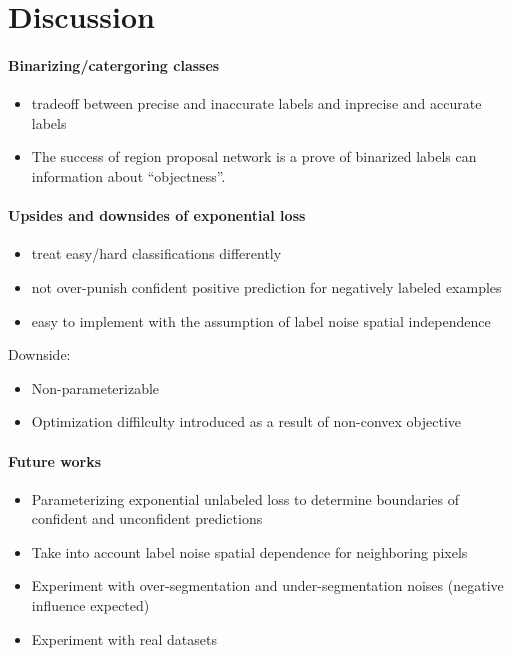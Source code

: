 \section{Discussion}
\label{sec:discussion}


\paragraph{Binarizing/catergoring classes}
\begin{itemize}
  \item tradeoff between precise and inaccurate labels and inprecise and accurate labels
  \item The success of region proposal network is a prove of binarized labels can information about ``objectness''.
\end{itemize}

\paragraph{Upsides and downsides of exponential loss}
\begin{itemize}
  \item treat easy/hard classifications differently
  \item not over-punish confident positive prediction for negatively labeled examples
  \item easy to implement with the assumption of label noise spatial independence
\end{itemize}


Downside:
\begin{itemize}
  \item Non-parameterizable
  \item Optimization diffilculty introduced as a result of non-convex objective
\end{itemize}


\paragraph{Future works}

\begin{itemize}
  \item Parameterizing exponential unlabeled loss to determine boundaries of confident and unconfident predictions
  \item Take into account label noise spatial dependence for neighboring pixels
  \item Experiment with over-segmentation and under-segmentation noises (negative influence expected)
  \item Experiment with real datasets
\end{itemize}
